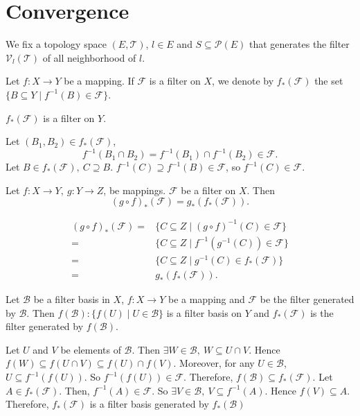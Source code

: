 \section{Convergence}
We fix a topology space $(E,\mathscr{T})$, $l\in E$ and $S\subseteq \mathscr{P}(E)$ that generates the filter $\mathcal{V}_l(\mathscr{T})$ of all neighborhood  of $l$.
\begin{definitionenv}
    Let $f:X\longrightarrow Y$ be a mapping. If $\mathcal{F}$ is a filter on $X$, we denote by $f_*(\mathcal{F})$ the set $\{B\subseteq Y\mid f^{-1}(B)\in\mathcal{F}\}$. 
\end{definitionenv}
\begin{propositionenv}
    $f_*(\mathcal{F})$ is a filter on $Y$.
\end{propositionenv}
\begin{proofenv}
    Let $(B_1,B_2)\in f_*(\mathcal{F})$,
    $$f^{-1}(B_1\cap B_2)=f^{-1}(B_1)\cap f^{-1}(B_2)\in \mathcal{F}.$$
    Let $B\in f_*(\mathcal{F}),\ C\supseteq B$. $f^{-1}(C)\supseteq f^{-1}(B)\in\mathcal{F}$, so $f^{-1}(C)\in \mathcal{F}$.
\end{proofenv}
\begin{propositionenv}
    Let $f:X\longrightarrow Y, \ g:Y\longrightarrow Z$, be mappings. $\mathcal{F}$ be a filter on $X$. Then
    $$\left(g\circ f\right)_{*}(\mathcal{F})=g_*(f_*(\mathcal{F})).$$
\end{propositionenv}
\begin{proofenv}
    \begin{align*}
        \left(g\circ f\right)_*(\mathcal{F})=&\{C\subseteq Z\mid \left(g\circ f\right)^{-1}(C)\in\mathcal{F}\}\\
        =&\{C\subseteq Z\mid f^{-1}(g^{-1}(C))\in \mathcal{F}\}\\
        =&\{C\subseteq Z\mid g^{-1}(C)\in f_*(\mathcal{F})\}\\
        =&g_*(f_*(\mathcal{F})).
    \end{align*}
\end{proofenv}
\begin{propositionenv}
    Let $\mathcal{B}$ be a filter basis in $X$,  $f:X\longrightarrow Y$ be a mapping and $\mathcal{F}$ be the filter generated by $\mathcal{B}$. Then $f(\mathcal{B}):\{f(U)\mid U\in \mathcal{B}\}$  is a filter basis on $Y$ and $f_*(\mathcal{F})$ is the filter generated by $f(\mathcal{B})$.
\end{propositionenv}
\begin{proofenv}
    Let $U$ and $V$ be elements of $\mathcal{B}$. Then $\exists W\in \mathcal{B},\ W\subseteq U\cap V$. Hence $f(W)\subseteq f(U\cap V)\subseteq f(U)\cap f(V).$ Moreover, for any $U\in\mathcal{B}$, $U\subseteq f^{-1}(f(U))$. So $f^{-1}(f(U))\in \mathcal{F}$. Therefore, $f(\mathcal{B})\subseteq f_*(\mathcal{F}) $. Let $A\in f_*(\mathcal{F})$. Then, $f^{-1}(A)\in \mathcal{F}$. So $\exists V\in \mathcal{B},\ V\subseteq f^{-1}(A)$. Hence $f(V)\subseteq A$. Therefore, $f_*(\mathcal{F})$ is a filter basis generated by $f_*(\mathcal{B})$
\end{proofenv}
